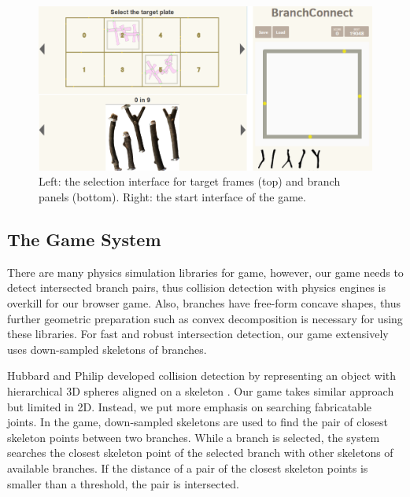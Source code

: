 \begin{figure}[ht]
  \begin{center}
    \includegraphics[width = 0.4\paperwidth]{images/interface/game_interface.png}
    \caption{Left: the selection interface for target frames (top) and branch panels (bottom). Right: the start interface of the game.}
    \label{fig:game_interface}
  \end{center}
\end{figure}
%
\subsection{The Game System}
There are many physics simulation libraries for game, however, our game needs to detect intersected branch pairs, thus collision detection with physics engines is overkill for our browser game.
Also, branches have free-form concave shapes, thus further geometric preparation such as convex decomposition is necessary for using these libraries.
For fast and robust intersection detection, our game extensively uses down-sampled skeletons of branches.

Hubbard and Philip developed collision detection by representing an object with hierarchical 3D spheres aligned on a skeleton \cite{Hubbard:1996:APS:231731.231732}.
Our game takes similar approach but limited in 2D.
Instead, we put more emphasis on searching fabricatable joints.
In the game, down-sampled skeletons are used to find the pair of closest skeleton points between two branches.
While a branch is selected, the system searches the closest skeleton point of the selected branch with other skeletons of available branches.
If the distance of a pair of the closest skeleton points is smaller than a threshold, the pair is intersected.


